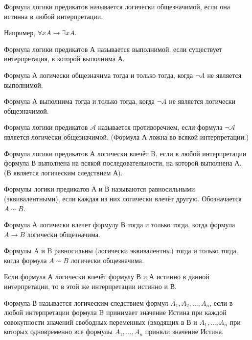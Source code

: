 \begin{definition}
	Формула логики предикатов называется логически общезначимой, если она
	истинна в любой интерпретации. 
\end{definition}

Например, $\forall xA \to \exists xA$.
\begin{definition}
	Формула логики предикатов А называется выполнимой, если существует
	интерпретация, в которой выполнима А.
\end{definition}

\begin{proposition}
Формула А логически общезначима тогда и только тогда, когда $\lnot A$ не является
выполнимой.
\end{proposition}

\begin{proposition}
	Формула А выполнима тогда и только тогда, когда $\lnot A$ не является
	логически общезначимой.
\end{proposition}

\begin{definition}
	Формула логики предикатов $\mathcal{A}$ называется противоречием, если
	формула $\lnot \mathcal{A}$ является логически общезначимой. (Формула А
	ложна во всякой интерпретации.)
\end{definition}

\begin{definition}
	Формула логики предикатов А логически влечёт B, если в любой
	интерпретации формула В выполнена на всякой последовательности, на
	которой выполнена А. (В является логическим следствием А).
\end{definition}

\begin{definition}
	Формулы логики предикатов А и В называются равносильными
	(эквивалентными), если каждая из них логически влечёт другую.
	Обозначается $A \sim B$.
\end{definition}

\begin{theorem}
	Формула А логически влечет формулу В тогда и только тогда, когда формула
	$A\to B$ логически общезначима.
\end{theorem}

\begin{theorem}
	Формулы A и B равносильны (логически эквивалентны) тогда и только тогда,
	когда формула $A \sim B$ логически общезначима.
\end{theorem}
\begin{theorem}
	Если формула А логически влечёт формулу В и А истинно в данной
	интерпретации, то в этой же интерпретации истинно и В.
\end{theorem}
\begin{definition}
	Формула В называется логическим следствием формул $A_1, A_2, \ldots,
	A_n$, если в любой интерпретации формула B принимает значение Истина при
	каждой совокупности значений свободных переменных (входящих в В и $A_1,
	\ldots, A_n$ при которых одновременно все формулы $A_1, \ldots, A_n$
	приняли значение Истина. 
\end{definition}

